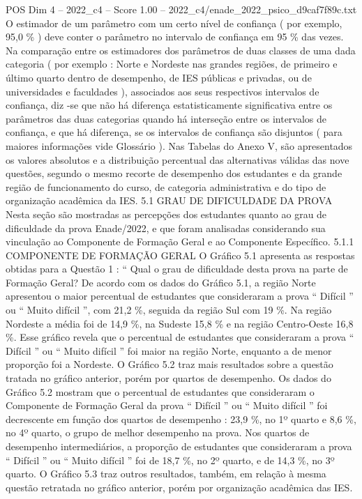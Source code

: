 \begin{textsample}{POS Dim 4 – 2022\_c4 – Score 1.00 – 2022\_c4/enade\_2022\_psico\_d9caf7f89c.txt}
O estimador de um parâmetro com um certo nível de confiança ( por exemplo, 95,0 \% ) deve conter o parâmetro no intervalo de confiança em 95 \% das vezes.
Na comparação entre os estimadores dos parâmetros de duas classes de uma dada categoria ( por exemplo : Norte e Nordeste nas grandes regiões, de primeiro e último quarto dentro de desempenho, de IES públicas e privadas, ou de universidades e faculdades ), associados aos seus respectivos intervalos de confiança, diz -se que não há diferença estatisticamente significativa entre os parâmetros das duas categorias quando há interseção entre os intervalos de confiança, e que há diferença, se os intervalos de confiança são disjuntos ( para maiores informações vide Glossário ).
Nas Tabelas do Anexo V, são apresentados os valores absolutos e a distribuição percentual das alternativas válidas das nove questões, segundo o mesmo recorte de desempenho dos estudantes e da grande região de funcionamento do curso, de categoria administrativa e do tipo de organização acadêmica da IES. 5.1 GRAU DE DIFICULDADE DA PROVA Nesta seção são mostradas as percepções dos estudantes quanto ao grau de dificuldade da prova Enade/2022, e que foram analisadas considerando sua vinculação ao Componente de Formação Geral e ao Componente Específico. 5.1.1 COMPONENTE DE FORMAÇÃO GERAL O Gráfico 5.1 apresenta as respostas obtidas para a Questão 1 : “ Qual o grau de dificuldade desta prova na parte de Formação Geral?
De acordo com os dados do Gráfico 5.1, a região Norte apresentou o maior percentual de estudantes que consideraram a prova “ Difícil ” ou “ Muito difícil ”, com 21,2 \%, seguida da região Sul com 19 \%.
Na região Nordeste a média foi de 14,9 \%, na Sudeste 15,8 \% e na região Centro-Oeste 16,8 \%.
Esse gráfico revela que o percentual de estudantes que consideraram a prova “ Difícil ” ou “ Muito difícil ” foi maior na região Norte, enquanto a de menor proporção foi a Nordeste.
O Gráfico 5.2 traz mais resultados sobre a questão tratada no gráfico anterior, porém por quartos de desempenho.
Os dados do Gráfico 5.2 mostram que o percentual de estudantes que consideraram o Componente de Formação Geral da prova “ Difícil ” ou “ Muito difícil ” foi decrescente em função dos quartos de desempenho : 23,9 \%, no 1º quarto e 8,6 \%, no 4º quarto, o grupo de melhor desempenho na prova.
Nos quartos de desempenho intermediários, a proporção de estudantes que consideraram a prova “ Difícil ” ou “ Muito difícil ” foi de 18,7 \%, no 2º quarto, e de 14,3 \%, no 3º quarto.
O Gráfico 5.3 traz outros resultados, também, em relação à mesma questão retratada no gráfico anterior, porém por organização acadêmica das IES.

\end{textsample}
